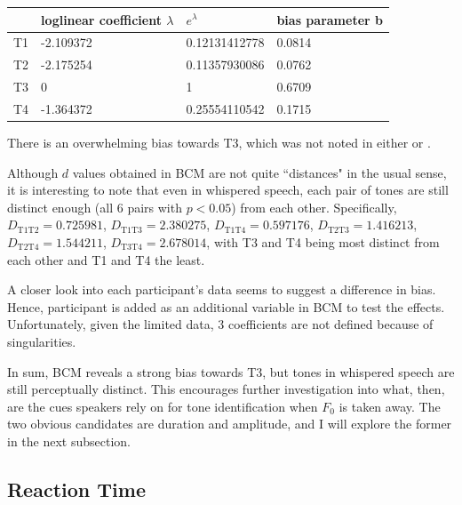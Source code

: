 \documentclass[12pt,letterpaper]{scrartcl}
\begin{document}
\vspace{0.25cm}
\begin{center}
    \begin{tabular}{c|p{4cm} p{4cm} p{4cm}}
        {} & loglinear coefficient $\lambda$ & $e^\lambda$ & bias parameter b \\ \hline
        T1 & -2.109372 & 0.12131412778 & 0.0814 \\
        T2 & -2.175254 & 0.11357930086 & 0.0762 \\
        T3 & 0 & 1 & 0.6709 \\
        T4 & -1.364372 & 0.25554110542 & 0.1715
    \end{tabular}
\end{center}
\vspace{0.25cm}

There is an overwhelming bias towards T3, which was not noted in either \cite{liu.samuel2004PerceptionMandarinLexical} or \cite{jiao.xu2019WhisperedMandarinhas}. 

Although $d$ values obtained in BCM are not quite ``distances" in the usual sense, it is interesting to note that even in whispered speech, each pair of tones are still distinct enough (all 6 pairs with $p < 0.05$) from each other. Specifically, $D_{\text{T1T2}} = 0.725981$, $D_{\text{T1T3}} = 2.380275$, $D_{\text{T1T4}} = 0.597176$, $D_{\text{T2T3}} = 1.416213$, $D_{\text{T2T4}} = 1.544211$, $D_{\text{T3T4}} = 2.678014$, with T3 and T4 being most distinct from each other and T1 and T4 the least. 

A closer look into each participant's data seems to suggest a difference in bias. Hence, participant is added as an additional variable in BCM to test the effects. Unfortunately, given the limited data, 3 coefficients are not defined because of singularities.

In sum, BCM reveals a strong bias towards T3, but tones in whispered speech are still perceptually distinct. This encourages further investigation into what, then, are the cues speakers rely on for tone identification when $F_0$ is taken away. The two obvious candidates are duration and amplitude, and I will explore the former in the next subsection.




\subsection{Reaction Time}
\end{document}
